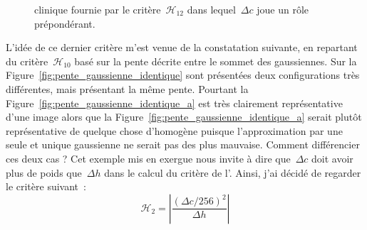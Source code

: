 \documentclass[main.tex]{subfiles}
\begin{document}
\begin{figure}[h]
\centering
{}
\caption{\label{fig:critere_dc2_sur_dh}\Hetero clinique fournie par le critère~$\mathcal{H}_{12}$ dans lequel~$\Delta c$ joue un rôle prépondérant.}
\end{figure}
L'idée de ce dernier critère m'est venue de la constatation suivante, en repartant du critère~$\mathscr{H}_{10}$ basé sur la pente décrite entre le sommet des gaussiennes. Sur la Figure~\ref{fig:pente_gaussienne_identique} sont présentées deux configurations très différentes, mais présentant la même pente. Pourtant la Figure~\ref{fig:pente_gaussienne_identique_a} est très clairement représentative d'une image \heterogene alors que la Figure~\ref{fig:pente_gaussienne_identique_a} serait plutôt représentative de quelque chose  d'homogène puisque l'approximation par une seule et unique gaussienne ne serait pas des plus mauvaise. 
Comment différencier ces deux cas ? Cet exemple mis en exergue nous invite à dire que~$\Delta c$ doit avoir plus de poids que~$\Delta h$ dans le calcul du critère de l'\hetero. Ainsi, j'ai décidé de regarder le critère suivant~:
\begin{equation}
\label{eq:criteres_finaux}
\mathcal{H}_{2} =  \left| \dfrac{(\Delta c /256)^2}{\Delta h} \right|
\end{equation}
\end{document}
